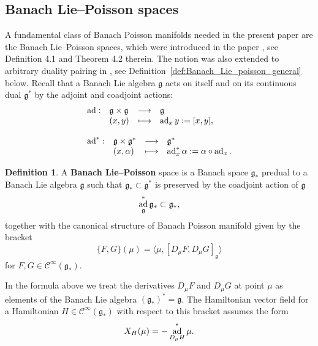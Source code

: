 \documentclass[a4paper,12pt,reqno]{amsart}%
\theoremstyle{definition}
\newtheorem{definition}[theorem]{Definition}
\theoremstyle{remark}
\numberwithin{theorem}{section}
\numberwithin{equation}{section}
\newcommand{\1}{{\bf 1}}
\DeclareMathOperator{\ad}{\textnormal{ad}}
\newcommand{\Cp}{\mathscr{C}}
\newcommand{\g}{{\mathfrak g}}
\begin{document}
\subsection{Banach Lie--Poisson spaces}
A fundamental class of Banach Poisson manifolds needed in the present paper are the Banach Lie--Poisson spaces, which were introduced in the paper \cite{OR}, see Definition 4.1 and Theorem 4.2 therein. The notion was also extended to arbitrary duality pairing in \cite{tumpach-bruhat}, see  Definition~\ref{def:Banach_Lie_poisson_general} below. 
Recall that a Banach Lie algebra $\mathfrak{g}$ acts on itself and on its continuous dual $\mathfrak{g}^*$ by the adjoint and coadjoint actions:
\[
\begin{array}{l}
\begin{array}{llll}
\ad: &\mathfrak{g}\times\mathfrak{g}&\longrightarrow &\mathfrak{g}\\
& (x, y) & \longmapsto & \ad_x y := [x , y ],
\end{array}
\\
\\
\begin{array}{llll}
\ad^*: &\mathfrak{g}\times\mathfrak{g}^*&\longrightarrow &\mathfrak{g}^*\\
& (x, \alpha) & \longmapsto & \ad^*_x \alpha := \alpha\circ \ad_x.
\end{array}
\end{array}
\]

\begin{definition}\label{def:blp}
A \textbf{Banach Lie--Poisson} space is a Banach space $\g_*$ predual to a Banach Lie algebra $\g$ such that $\g_*\subset \g^*$ is preserved by the coadjoint action of $\g$
\begin{equation}\label{blp-condition}
\ad^*_\g \g_*\subset \g_*,
\end{equation}
together with the canonical structure of Banach Poisson manifold given by the bracket
\[ \label{blp-pb}
\{F,G\}(\mu) = \langle \mu, [D_\mu F,D_\mu G]_\g \rangle \]
for $F,G\in \Cp^\infty(\g_*)$. 
\end{definition}

In the formula above we treat the derivatives $D_\mu F$ and $D_\mu G$ at point $\mu$ as elements of the Banach Lie algebra $(\g_*)^*=\g$. The Hamiltonian vector field for a Hamiltonian $H\in \Cp^\infty(\g_*)$ with respect to this bracket assumes the form
\begin{equation} \label{blp-hvf}
X_H(\mu) = -\ad^*_{D_\mu H}\mu.
\end{equation}
\end{document}
